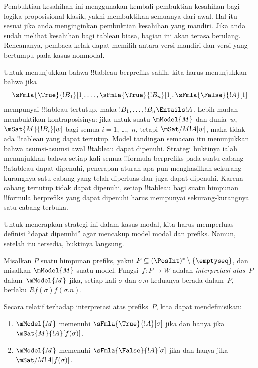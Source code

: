 \documentclass[../../../include/open-logic-section]{subfiles}
\begin{document}


\begin{editorial}
  Pembuktian kesahihan ini menggunakan kembali pembuktian kesahihan bagi
  logika proposisional klasik, yakni membuktikan semuanya dari awal. Hal itu
  sesuai jika anda menginginkan pembuktian kesahihan yang mandiri. Jika anda
  sudah melihat kesahihan bagi tableau biasa, bagian ini akan terasa
  berulang. Rencananya, pembaca kelak dapat memilih antara versi mandiri dan
  versi yang bertumpu pada kasus nonmodal.
\end{editorial}

\begin{explain}
  Untuk menunjukkan bahwa !!{tableau} berprefiks sahih, kita harus
  menunjukkan bahwa jika
  \[
  \sFmla{\True}{!B_1}[1], \dots, \sFmla{\True}{!B_n}[1],
  \sFmla{\False}{!A}[1]
  \]
  mempunyai !!{tableau} tertutup, maka
  $!B_1, \dots, !B_n \Entails !A$. Lebih mudah membuktikan
  kontraposisinya: jika untuk suatu $\mModel{M}$ dan dunia~$w$,
  $\mSat{M}{!B_i}[w]$ bagi semua $i=1$, \dots,~$n$, tetapi
  $\mSat/{M}{!A}[w]$, maka tidak ada !!{tableau} yang dapat tertutup. Model
  tandingan semacam itu menunjukkan bahwa asumsi-asumsi awal !!{tableau}
  dapat dipenuhi. Strategi buktinya ialah menunjukkan bahwa setiap kali
  semua !!{formula} berprefiks pada suatu cabang !!a{tableau} dapat dipenuhi,
  penerapan aturan apa pun menghasilkan sekurang-kurangnya satu cabang yang
  telah diperluas dan juga dapat dipenuhi. Karena cabang tertutup tidak dapat
  dipenuhi, setiap !!{tableau} bagi suatu himpunan !!{formula} berprefiks
  yang dapat dipenuhi harus mempunyai sekurang-kurangnya satu cabang terbuka.

  Untuk menerapkan strategi ini dalam kasus modal, kita harus memperluas
  definisi ``dapat dipenuhi'' agar mencakup model modal dan prefiks. Namun,
  setelah itu tersedia, buktinya langsung.
\end{explain}

\begin{defn}
  Misalkan $P$ suatu himpunan prefiks, yakni
  $P \subseteq (\PosInt)^* \setminus \{\emptyseq\}$, dan misalkan
  $\mModel{M}$ suatu model. Fungsi~$f\colon P \to W$ adalah
  \emph{interpretasi atas}~$P$ dalam~$\mModel{M}$ jika, setiap kali
  $\sigma$ dan $\sigma.n$ keduanya berada dalam~$P$, berlaku
  $Rf(\sigma)f(\sigma.n)$.

  Secara relatif terhadap interpretasi atas prefiks~$P$, kita dapat
  mendefinisikan:
  \begin{enumerate}
  \item $\mModel{M}$ memenuhi $\sFmla{\True}{!A}[\sigma]$ jika dan hanya jika
    $\mSat{M}{!A}[f(\sigma)]$.
  \item $\mModel{M}$ memenuhi $\sFmla{\False}{!A}[\sigma]$ jika dan hanya jika
    $\mSat/{M}{!A}[f(\sigma)]$.
  \end{enumerate}
\end{defn}
\end{document}
